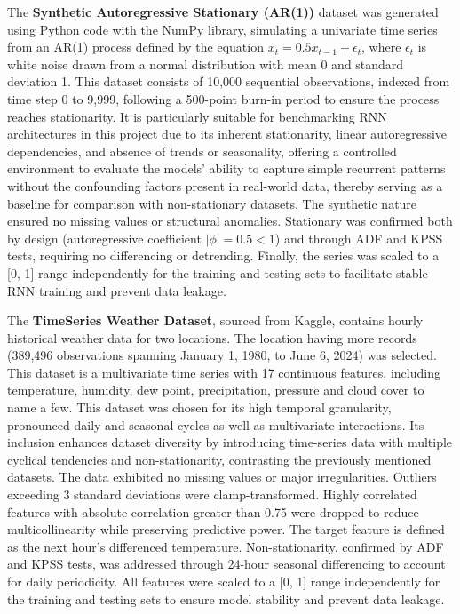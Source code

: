 \documentclass[conference, 10pt]{IEEEtran}
\begin{document}
The \textbf{Synthetic Autoregressive Stationary (AR(1))} dataset was generated using Python code with the NumPy library,
simulating a univariate time series from an AR(1) process defined by the equation $x_t = 0.5 x_{t-1} + \epsilon_t$,
where $\epsilon_t$ is white noise drawn from a normal distribution with mean 0 and standard deviation 1. This dataset
consists of 10,000 sequential observations, indexed from time step 0 to 9,999, following a 500-point burn-in period to
ensure the process reaches stationarity. It is particularly suitable for benchmarking RNN architectures in this project
due to its inherent stationarity, linear autoregressive dependencies, and absence of trends or seasonality, offering a
controlled environment to evaluate the models' ability to capture simple recurrent patterns without the confounding
factors present in real-world data, thereby serving as a baseline for comparison with non-stationary datasets. The
synthetic nature ensured no missing values or structural anomalies. Stationary was confirmed both by design
(autoregressive coefficient $|\phi| = 0.5 < 1$) and through ADF and KPSS tests, requiring no differencing or detrending.
Finally, the series was scaled to a [0, 1] range independently for the training and testing sets to facilitate stable
RNN training and prevent data leakage.

The \textbf{TimeSeries Weather Dataset}, sourced from Kaggle, contains hourly historical weather data for two locations.
The location having more records (389,496 observations spanning January 1, 1980, to June 6, 2024) was selected. This
dataset is a multivariate time series with 17 continuous features, including temperature, humidity, dew point,
precipitation, pressure and cloud cover to name a few. This dataset was chosen for its high temporal granularity,
pronounced daily and seasonal cycles as well as multivariate interactions. Its inclusion enhances dataset diversity by
introducing time-series data with multiple cyclical tendencies and non-stationarity, contrasting the previously
mentioned datasets. The data exhibited no missing values or major irregularities. Outliers exceeding 3 standard
deviations were clamp-transformed. Highly correlated features with absolute correlation greater than 0.75 were dropped
to reduce multicollinearity while preserving predictive power. The target feature is defined as the next hour's
differenced temperature. Non-stationarity, confirmed by ADF and KPSS tests, was addressed through 24-hour seasonal
differencing to account for daily periodicity. All features were scaled to a [0, 1] range independently for the training
and testing sets to ensure model stability and prevent data leakage.
\end{document}
